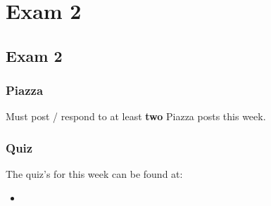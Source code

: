 \clearpage

\renewcommand{\ChapTitle}{Exam 2}
\renewcommand{\SectionTitle}{Exam 2}

\chapter{\ChapTitle}
\section{\SectionTitle}

\subsection{Piazza}

Must post / respond to at least \textbf{two} Piazza posts this week.

\subsection{Quiz}

The quiz's for this week can be found at:

\begin{itemize}
    \item {}
\end{itemize}
